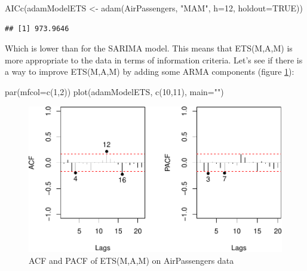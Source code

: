\documentclass[
]{book}
\newenvironment{Shaded}{\begin{snugshade}}{\end{snugshade}}
\newcommand{\AttributeTok}[1]{\textcolor[rgb]{0.77,0.63,0.00}{#1}}
\newcommand{\ConstantTok}[1]{\textcolor[rgb]{0.00,0.00,0.00}{#1}}
\newcommand{\DecValTok}[1]{\textcolor[rgb]{0.00,0.00,0.81}{#1}}
\newcommand{\FunctionTok}[1]{\textcolor[rgb]{0.00,0.00,0.00}{#1}}
\newcommand{\NormalTok}[1]{#1}
\newcommand{\OtherTok}[1]{\textcolor[rgb]{0.56,0.35,0.01}{#1}}
\newcommand{\StringTok}[1]{\textcolor[rgb]{0.31,0.60,0.02}{#1}}
\theoremstyle{definition}
\theoremstyle{definition}
\theoremstyle{definition}
\theoremstyle{definition}
\theoremstyle{remark}
\begin{document}
\begin{Shaded}
\begin{Highlighting}[]
\FunctionTok{AICc}\NormalTok{(adamModelETS }\OtherTok{\textless{}{-}} \FunctionTok{adam}\NormalTok{(AirPassengers, }\StringTok{"MAM"}\NormalTok{,}
                          \AttributeTok{h=}\DecValTok{12}\NormalTok{, }\AttributeTok{holdout=}\ConstantTok{TRUE}\NormalTok{))}
\end{Highlighting}
\end{Shaded}

\begin{verbatim}
## [1] 973.9646
\end{verbatim}

Which is lower than for the SARIMA model. This means that ETS(M,A,M) is more appropriate to the data in terms of information criteria. Let's see if there is a way to improve ETS(M,A,M) by adding some ARMA components (figure \ref{fig:adamETSPlotAirACFPACF}):

\begin{Shaded}
\begin{Highlighting}[]
\FunctionTok{par}\NormalTok{(}\AttributeTok{mfcol=}\FunctionTok{c}\NormalTok{(}\DecValTok{1}\NormalTok{,}\DecValTok{2}\NormalTok{))}
\FunctionTok{plot}\NormalTok{(adamModelETS, }\FunctionTok{c}\NormalTok{(}\DecValTok{10}\NormalTok{,}\DecValTok{11}\NormalTok{), }\AttributeTok{main=}\StringTok{""}\NormalTok{)}
\end{Highlighting}
\end{Shaded}

\begin{figure}
\centering
\includegraphics{adam_files/figure-latex/adamETSPlotAirACFPACF-1.pdf}
\caption{\label{fig:adamETSPlotAirACFPACF}ACF and PACF of ETS(M,A,M) on AirPassengers data}
\end{figure}
\end{document}
